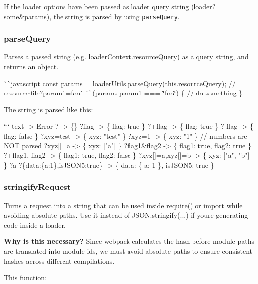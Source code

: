If the loader options have been passed as loader query string ({\ttfamily loader?some\&params}), the string is parsed by using \href{#parsequery}{\tt {\ttfamily parse\+Query}}.

\subsubsection*{{\ttfamily parse\+Query}}

Parses a passed string (e.\+g. {\ttfamily loader\+Context.\+resource\+Query}) as a query string, and returns an object.

\`{}\`{}{\ttfamily javascript const params = loader\+Utils.\+parse\+Query(this.\+resource\+Query); // resource\+:}file?param1=foo\`{} if (params.\+param1 === \char`\"{}foo\char`\"{}) \{ // do something \} 
\begin{DoxyCode}
The string is parsed like this:

``` text
                             -> Error
?                            -> \{\}
?flag                        -> \{ flag: true \}
?+flag                       -> \{ flag: true \}
?-flag                       -> \{ flag: false \}
?xyz=test                    -> \{ xyz: "test" \}
?xyz=1                       -> \{ xyz: "1" \} // numbers are NOT parsed
?xyz[]=a                     -> \{ xyz: ["a"] \}
?flag1&flag2                 -> \{ flag1: true, flag2: true \}
?+flag1,-flag2               -> \{ flag1: true, flag2: false \}
?xyz[]=a,xyz[]=b             -> \{ xyz: ["a", "b"] \}
?a%
?\{data:\{a:1\},isJSON5:true\}   -> \{ data: \{ a: 1 \}, isJSON5: true \}
\end{DoxyCode}


\subsubsection*{{\ttfamily stringify\+Request}}

Turns a request into a string that can be used inside {\ttfamily require()} or {\ttfamily import} while avoiding absolute paths. Use it instead of {\ttfamily J\+S\+O\+N.\+stringify(...)} if you\textquotesingle{}re generating code inside a loader.

{\bfseries Why is this necessary?} Since webpack calculates the hash before module paths are translated into module ids, we must avoid absolute paths to ensure consistent hashes across different compilations.

This function\+:


